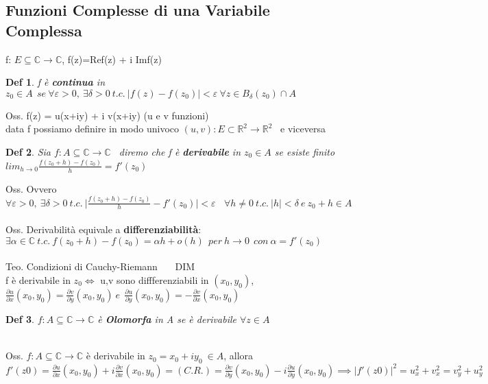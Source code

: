 \documentclass{article}
\theoremstyle{unnumbered}
\newtheorem* {theoremT}{Def}
\theoremstyle{unnumbered1}
\newenvironment{defi}{\begin{gBox}\begin{theoremT}}{\end{theoremT}\end{gBox}}
\begin{document}
\subsection{Funzioni Complesse di una Variabile Complessa}
f: $E\subseteq\mathbb{C}\rightarrow\mathbb{C}$,  f(z)=Ref(z)  +  i Imf(z)
%
\begin{defi}
f è \textbf{continua} in $z_0 	\in A \ \ se \ \forall \varepsilon >0,\ \exists \delta >0 \ t.c.\ |f(z)-f(z_0)|<\varepsilon \ \forall z \in B_{\delta} (z_0) \cap  A$
\end{defi}
%
Oss. f(z) = u(x+iy) + i v(x+iy) (u e v funzioni) \\ data f possiamo definire in modo univoco $(u,v): E \subset\mathbb{R}^2\rightarrow\mathbb{R}^2 $ \ e viceversa
%
\begin{defi}
Sia $f:A\subseteq\mathbb{C}\rightarrow\mathbb{C}$ \ diremo che f è \textbf{derivabile} in $z_0\in A$ se esiste finito  \ $lim_{h\rightarrow 0} \frac{f(z_0 + h)-f(z_0)}{h} = f'(z_0)$
\end{defi}
%
Oss.  Ovvero $\forall\varepsilon >0 , \ \exists \delta>0 \ t.c. \ \lvert \frac{f(z_0+h)-f(z_0)}{h} - f'(z_0) \rvert <\varepsilon \ \ \ \  \forall h \neq 0 \ t.c. \ |h|<\delta \ e \ z_0+h \in A $\\ \\
%
Oss. Derivabilità equivale a  \textbf{differenziabilità}:\\ $\exists \alpha \in \mathbb{C} \ t.c. \ f(z_0 +h) -f(z_0) = \alpha h + o(h) \ \ per \ h \rightarrow 0 \ \ con\ \alpha=f'(z_0)$\\ \\
%
%
Teo. Condizioni di Cauchy-Riemann \ \ \ DIM\\
f è derivabile in $z_0 \Longleftrightarrow$ u,v sono diffferenziabili in $(x_0,y_0)$, \ $\frac{\partial u}{\partial x}(x_0,y_0) = \frac{\partial v}{\partial y}(x_0,y_0) \ e \ \ \frac{\partial u}{\partial y}(x_0,y_0) = - \frac{\partial v}{\partial x}(x_0,y_0)$\\ 
%
%
\begin{defi}$f:A\subseteq\mathbb{C}\rightarrow\mathbb{C}$ è \textbf{Olomorfa} in A se è derivabile $\forall z\in A$
\end{defi}
\phantom{}\\
%
%
Oss. $f:A\subseteq\mathbb{C}\rightarrow\mathbb{C}$ è derivabile in $z_0=x_0+iy_0 \ \in A$, allora\\
$f'(z0) = \frac{\partial u}{\partial x}(x_0,y_0) + i\frac{\partial v}{\partial x}(x_0,y_0) = (C.R.) = \frac{\partial v}{\partial y}(x_0,y_0) -i \frac{\partial u}{\partial y}(x_0,y_0) \implies |f'(z0)|^2 = u_x^2+v_x^2 = v_y^2+u_y^2$ \\
\end{document}
